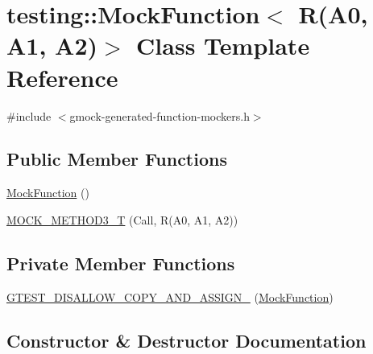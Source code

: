 \hypertarget{classtesting_1_1_mock_function_3_01_r_07_a0_00_01_a1_00_01_a2_08_4}{}\section{testing\+::Mock\+Function$<$ R(A0, A1, A2)$>$ Class Template Reference}
\label{classtesting_1_1_mock_function_3_01_r_07_a0_00_01_a1_00_01_a2_08_4}


{\ttfamily \#include $<$gmock-\/generated-\/function-\/mockers.\+h$>$}

\subsection*{Public Member Functions}
\begin{DoxyCompactItemize}
\item 
\mbox{\hyperlink{classtesting_1_1_mock_function_3_01_r_07_a0_00_01_a1_00_01_a2_08_4_a33e409a6528b41103fe36844e4bb2bfe}{Mock\+Function}} ()
\item 
\mbox{\hyperlink{classtesting_1_1_mock_function_3_01_r_07_a0_00_01_a1_00_01_a2_08_4_afcc79eab94b7d873f71ccf7b08ce582f}{M\+O\+C\+K\+\_\+\+M\+E\+T\+H\+O\+D3\+\_\+T}} (Call, R(A0, A1, A2))
\end{DoxyCompactItemize}
\subsection*{Private Member Functions}
\begin{DoxyCompactItemize}
\item 
\mbox{\hyperlink{classtesting_1_1_mock_function_3_01_r_07_a0_00_01_a1_00_01_a2_08_4_acf04153a26d9b03d0f3bf1abf9fdb694}{G\+T\+E\+S\+T\+\_\+\+D\+I\+S\+A\+L\+L\+O\+W\+\_\+\+C\+O\+P\+Y\+\_\+\+A\+N\+D\+\_\+\+A\+S\+S\+I\+G\+N\+\_\+}} (\mbox{\hyperlink{classtesting_1_1_mock_function}{Mock\+Function}})
\end{DoxyCompactItemize}


\subsection{Constructor \& Destructor Documentation}
\mbox{\label{classtesting_1_1_mock_function_3_01_r_07_a0_00_01_a1_00_01_a2_08_4_a33e409a6528b41103fe36844e4bb2bfe}} 
